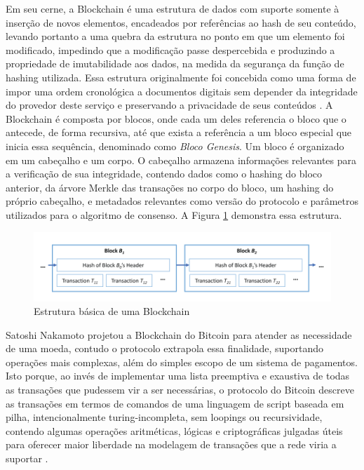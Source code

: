 \documentclass[a4paper,11pt]{article}
\begin{document}
Em seu cerne, a Blockchain é uma estrutura de dados com suporte somente à inserção de novos elementos, encadeados por referências ao hash de seu conteúdo, levando portanto a uma quebra da estrutura no ponto em que um elemento foi modificado, impedindo que a modificação passe despercebida e produzindo a propriedade de imutabilidade aos dados, na medida da segurança da função de hashing utilizada.
Essa estrutura originalmente foi concebida como uma forma de impor uma ordem cronológica a documentos digitais sem depender da integridade do provedor deste serviço e preservando a privacidade de seus conteúdos \cite{Haber1991}.
A Blockchain é composta por blocos, onde cada um deles referencia o bloco que o antecede, de forma recursiva, até que exista a referência a um bloco especial que inicia essa sequência, denominado como \emph{Bloco Genesis}.
Um bloco é organizado em um cabeçalho e um corpo.
O cabeçalho armazena informações relevantes para a verificação de sua integridade, contendo dados como o hashing do bloco anterior, da árvore Merkle das transações no corpo do bloco, um hashing do próprio cabeçalho, e metadados relevantes como versão do protocolo e parâmetros utilizados para o algoritmo de consenso.
A Figura \ref{fig:blockchain} demonstra essa estrutura.

\begin{figure}[htp]
    \centering
    \includegraphics[width=\textwidth]{images/exemplo-de-blockchain.png}
    \caption{Estrutura básica de uma Blockchain}
    \label{fig:blockchain}
\end{figure}

Satoshi Nakamoto projetou a Blockchain do Bitcoin para atender as necessidade de uma moeda, contudo o protocolo extrapola essa finalidade, suportando operações mais complexas, além do simples escopo de um sistema de pagamentos.
Isto porque, ao invés de implementar uma lista preemptiva e exaustiva de todas as transações que pudessem vir a ser necessárias, o protocolo do Bitcoin descreve as transações em termos de comandos de uma linguagem de script baseada em pilha, intencionalmente turing-incompleta, sem loopings ou recursividade, contendo algumas operações aritméticas, lógicas e criptográficas julgadas úteis para oferecer maior liberdade na modelagem de transações que a rede viria a suportar \cite{Narayanan2016a}.
\end{document}
